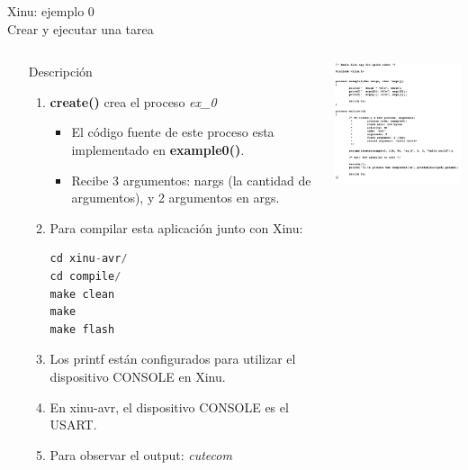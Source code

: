\documentclass[8pt,aspectratio=169,compress]{beamer}
\begin{document}
\begin{frame}[fragile]{Xinu: ejemplo 0 \\ Crear y ejecutar una tarea}

    \begin{columns}[onlytextwidth,T]
      \column{\dimexpr\linewidth-70mm-5mm}

\begin{small}
	\begin{itemize}
\bigskip
  \item[Descripción]
\begin{enumerate}
\item \textbf{create()} crea el proceso \textit{ex\_0}
\begin{itemize}
\item El código fuente de este proceso esta implementado en \textbf{example0()}.
\item Recibe 3 argumentos: nargs (la cantidad de argumentos), y 2 argumentos en args.
\end{itemize}

\bigskip
\item Para compilar esta aplicación junto con Xinu: 

\begin{lstlisting}[language=c,basicstyle=\footnotesize]
cd xinu-avr/
cd compile/
make clean
make
make flash
\end{lstlisting}
\bigskip
\item Los printf están configurados para utilizar el dispositivo CONSOLE en Xinu. 

\bigskip
\item En xinu-avr, el dispositivo CONSOLE es el USART.

\bigskip
\item Para observar el output: \textit{cutecom}
\end{enumerate}
	\end{itemize}

\end{small}

      \column{60mm}
     \includegraphics[width=62mm]{images/ejemplo0.jpg}

    \end{columns}
\end{frame}
\end{document}
